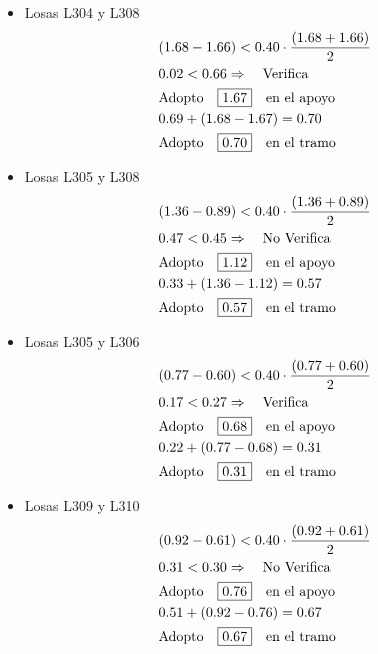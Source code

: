 \begin{enumerate}
\begin{itemize}
\item Losas L304 y L308
\begin{align*}
& (1.68-1.66) < 0.40 \cdot \frac{(1.68+1.66)}{2}\\
& 0.02 < 0.66 \Rightarrow \quad \text{Verifica}\\
& \text{Adopto} \quad \framebox{1.67} \quad \text{en el apoyo}\\
& 0.69 + (1.68-1.67) = 0.70\\
& \text{Adopto} \quad \framebox{0.70} \quad \text{en el tramo}\\
\end{align*}

\item Losas L305 y L308
\begin{align*}
& (1.36-0.89) < 0.40 \cdot \frac{(1.36+0.89)}{2}\\
& 0.47 < 0.45 \Rightarrow \quad \text{No Verifica}\\
& \text{Adopto} \quad \framebox{1.12} \quad \text{en el apoyo}\\
& 0.33 + (1.36-1.12) = 0.57\\
& \text{Adopto} \quad \framebox{0.57} \quad \text{en el tramo}\\
\end{align*}

\item Losas L305 y L306
\begin{align*}
& (0.77-0.60) < 0.40 \cdot \frac{(0.77+0.60)}{2}\\
& 0.17 < 0.27 \Rightarrow \quad \text{Verifica}\\
& \text{Adopto} \quad \framebox{0.68} \quad \text{en el apoyo}\\
& 0.22 + (0.77-0.68) = 0.31\\
& \text{Adopto} \quad \framebox{0.31} \quad \text{en el tramo}\\
\end{align*}

\item Losas L309 y L310
\begin{align*}
& (0.92-0.61) < 0.40 \cdot \frac{(0.92+0.61)}{2}\\
& 0.31 < 0.30 \Rightarrow \quad \text{No Verifica}\\
& \text{Adopto} \quad \framebox{0.76} \quad \text{en el apoyo}\\
& 0.51 + (0.92-0.76) = 0.67\\
& \text{Adopto} \quad \framebox{0.67} \quad \text{en el tramo}\\
\end{align*}
\end{itemize}


\end{enumerate}
